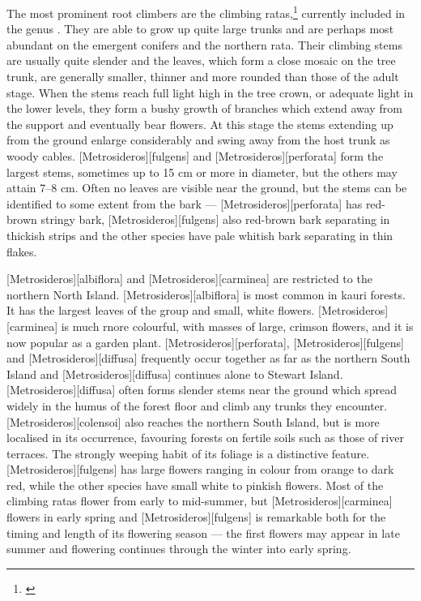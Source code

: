 The most prominent root climbers are the climbing ratas,\footnote{\cite{dawson1967growth}} currently included in the genus .
They are able to grow up quite large trunks and are perhaps most abundant on the emergent conifers and the northern rata.
Their climbing stems are usually quite slender and the leaves, which form a close mosaic on the tree trunk, are generally smaller, thinner and more rounded than those of the adult stage.
When the stems reach full light high in the tree crown, or adequate light in the lower levels, they form a bushy growth of branches which extend away from the support and eventually bear flowers.
At this stage the stems extending up from the ground enlarge considerably and swing away from the host trunk as woody cables. [Metrosideros][fulgens] and [Metrosideros][perforata] form the largest stems, sometimes up to 15 cm or more in diameter, but the others may attain 7--8 cm.
Often no leaves are visible near the ground, but the stems can be identified to some extent from the bark --- [Metrosideros][perforata] has red-brown stringy bark, [Metrosideros][fulgens] also red-brown bark separating in thickish strips and the other species have pale whitish bark separating in thin flakes.

[Metrosideros][albiflora] and [Metrosideros][carminea] are restricted to the northern North Island. [Metrosideros][albiflora] is most common in kauri forests.
It has the largest leaves of the group and small, white flowers. [Metrosideros][carminea] is much rnore colourful, with masses of large, crimson flowers, and it is now popular as a garden plant. [Metrosideros][perforata], [Metrosideros][fulgens] and [Metrosideros][diffusa] frequently occur together as far as the northern South Island and [Metrosideros][diffusa] continues alone to Stewart Island. [Metrosideros][diffusa] often forms slender stems near the ground which spread widely in the humus of the forest floor and climb any trunks they encounter. [Metrosideros][colensoi] also reaches the northern South Island, but is more localised in its occurrence, favouring forests on fertile soils such as those of river terraces.
The strongly weeping habit of its foliage is a distinctive feature. [Metrosideros][fulgens] has large flowers ranging in colour from orange to dark red, while the other species have small white to pinkish flowers.
Most of the climbing ratas flower from early to mid-summer, but [Metrosideros][carminea] flowers in early spring and [Metrosideros][fulgens] is remarkable both for the timing and length of its flowering season --- the first flowers may appear in late summer and flowering continues through the winter into early spring.

